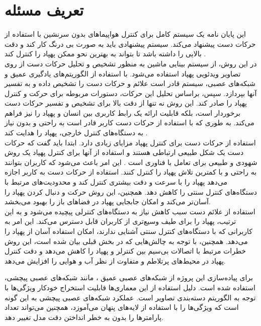 \section{تعریف مسئله}

این پایان نامه یک سیستم کامل برای کنترل هواپیماهای بدون سرنشین 
با استفاده از حرکات دست پیشنهاد می‌کند. سیستم پیشنهادی باید به صورت بی درنگ   کار کند و دقت بالایی را داشته باشد تا بتواند به بهترین نحو ممکن پهپاد را کنترل کند \cite{hadri2018hand}.
\\
در این روش، از سیستم بینایی ماشین به منظور تشخیص و تحلیل حرکات دست از روی تصاویر ویدئویی پهپاد استفاده می‌شود. با استفاده از الگوریتم‌های یادگیری عمیق و شبکه‌های عصبی، سیستم 
قادر است علائم و حرکات دست را تشخیص داده و به تفسیر آنها بپردازد. سپس، براساس تحلیل این حرکات، دستورات مربوطه برای حرکت و کنترل پهپاد را صادر کند.
 این روش نه تنها از دقت بالا برای تشخیص و تفسیر حرکات دست برخوردار است، بلکه قابلیت ارائه یک رابط کاربری بین انسان و پهپاد را نیز فراهم می‌کند. 
به طوری که با استفاده از حرکات دست کاربر قادر است به راحتی و بدون نیاز به دستگاه‌های کنترل خارجی، پهپاد را هدایت کند \cite{yoo2022motion}.
\\
استفاده از حرکات دست برای کنترل پهپاد مزایای زیادی دارد. ابتدا باید گفت که حرکات دست یک شکل طبیعی ارتباطی هستند و استفاده از آنها برای کنترل پهپاد یک روش شهودی و طبیعی برای تعامل با فناوری است
. این امر باعث می‌شود که کاربران بتوانند به راحتی و با کمترین تلاش پهپاد را کنترل کنند. استفاده از حرکات دست به کاربر اجازه می‌دهد پهپاد را با سرعت و دقت
بیشتری کنترل کند و محدودیت‌های مرتبط با دستگاه‌های کنترل سنتی را کاهش دهد. همچنین، این روش حرکت و دنبال کردن پهپاد را آسان‌تر می‌کند و امکان جابجایی پهپاد در فضا‌های باز را بهبود می‌بخشد.
\\
استفاده از علائم دست سبب کاهش نیاز به دستگاه‌های کنترلی پیچیده می‌شود و به این ترتیب، پهپاد را برای طیف وسیع‌تری از کاربران قابل دسترس می‌کند.
این امر به کاربرانی که با دستگاه‌های کنترل سنتی آشنایی ندارند، امکان استفاده آسان از پهپاد را می‌دهد. همچنین، با توجه به چالش‌هایی که در بخش قبلی بیان شده است، 
این روش خطرات مرتبط با اتصالات بی‌سیم بین کنترلر و پهپاد را کاهش می‌دهد و دقت کنترل پهپاد در محیط‌های پرتلاطم و متفاوت از نظر آب و هوایی را افزایش می‌دهد. 


برای پیاده‌سازی این پروژه از شبکه‌های عصبی عمیق
، مانند شبکه‌های عصبی پیچشی، استفاده شده است. دلیل استفاده از این معماری‌ها قابلیت استخراج خودکار ویژگی‌ها با توجه به الگوریتم دسته‌بندی تصاویر
است. عملکرد شبکه‌های عصبی پیچشی به این گونه است که ویژگی‌ها را با استفاده از  لایه‌های پنهان
می‌آموزد، همچنین می‌تواند تعداد پارامترها را بدون به خطر انداختن دقت مدل تغییر دهد.

